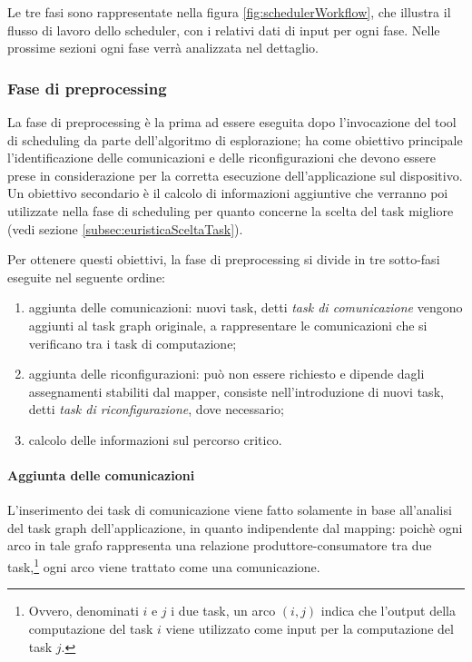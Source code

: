 Le tre fasi sono rappresentate nella figura \ref{fig:schedulerWorkflow}, che 
illustra il flusso di lavoro dello scheduler, con i relativi dati di input per 
ogni fase. Nelle prossime sezioni ogni fase verrà analizzata nel dettaglio.


\subsubsection{Fase di preprocessing}
\label{subsec:fasePreprocessing}
La fase di preprocessing è la prima ad essere eseguita dopo l'invocazione del 
tool di scheduling da parte dell'algoritmo di esplorazione; ha come obiettivo 
principale l'identificazione delle comunicazioni e delle riconfigurazioni che 
devono essere prese in considerazione per la corretta esecuzione 
dell'applicazione sul dispositivo. Un obiettivo secondario è il calcolo di 
informazioni aggiuntive che verranno poi utilizzate nella fase di scheduling 
per quanto concerne la scelta del task migliore (vedi sezione 
\ref{subsec:euristicaSceltaTask}).

Per ottenere questi obiettivi, la fase di preprocessing si divide in tre 
sotto-fasi eseguite nel seguente ordine:
\begin{enumerate}
 \item aggiunta delle comunicazioni: nuovi task, detti \emph{task di 
comunicazione} vengono aggiunti al task graph originale, a rappresentare le 
comunicazioni che si verificano tra i task di computazione;
 \item aggiunta delle riconfigurazioni: può non essere richiesto e dipende 
dagli assegnamenti stabiliti dal mapper, consiste nell'introduzione di nuovi 
task, detti \emph{task di riconfigurazione}, dove necessario;
 \item calcolo delle informazioni sul percorso critico.
\end{enumerate}

\paragraph{Aggiunta delle comunicazioni}
\label{par:aggiuntaComunicazioni}
L'inserimento dei task di comunicazione viene fatto solamente in base 
all'analisi del task graph dell'applicazione, in quanto indipendente dal 
mapping: poichè ogni arco in tale grafo rappresenta una relazione 
produttore-consumatore tra due task,\footnote{Ovvero, denominati $i$ e $j$ i due 
task, un arco $(i,j)$ indica che l'output della computazione del task $i$ viene 
utilizzato come input per la computazione del task $j$.} ogni arco viene 
trattato come una comunicazione.

